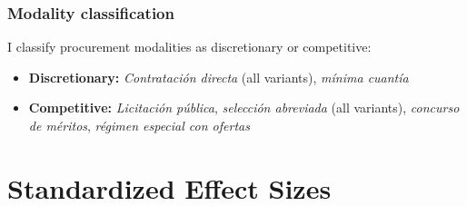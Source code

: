 \documentclass[12pt]{article}
\begin{document}
\subsubsection*{Modality classification} I classify procurement modalities as discretionary or competitive:
\begin{itemize}
\item \textbf{Discretionary:} \textit{Contrataci\'{o}n directa} (all variants), \textit{m\'{i}nima cuant\'{i}a}
\item \textbf{Competitive:} \textit{Licitaci\'{o}n p\'{u}blica}, \textit{selecci\'{o}n abreviada} (all variants), \textit{concurso de m\'{e}ritos}, \textit{r\'{e}gimen especial con ofertas}
\end{itemize}


\section{Standardized Effect Sizes}
\label{sec:sde}


\end{document}
